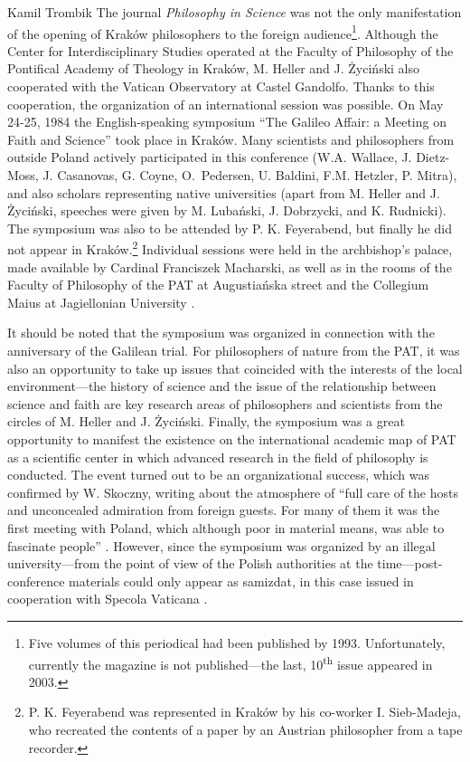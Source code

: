 \begin{artengenv}{Kamil Trombik}
The journal \textit{Philosophy in Science} was not the only manifestation of the opening of Kraków philosophers to the
foreign audience\footnote{Five volumes of this periodical had been published by 1993. Unfortunately, currently the
magazine is not published---the last, 10\textsuperscript{th} issue appeared in 2003.}. Although the Center for
Interdisciplinary Studies operated at the Faculty of Philosophy of the Pontifical Academy of Theology in Kraków, M.
Heller and J. Życiński also cooperated with the Vatican Observatory at Castel Gandolfo. Thanks to this cooperation, the
organization of an international session was possible. On May 24-25, 1984 the English-speaking symposium ``The Galileo
Affair: a Meeting on Faith and Science'' took place in Kraków. Many scientists and philosophers from outside Poland
actively participated in this conference (W.A. Wallace, J. Dietz-Moss, J. Casanovas, G. Coyne, O.~Pedersen, U. Baldini,
F.M. Hetzler, P. Mitra), and also scholars representing native universities (apart from M. Heller and J. Życiński,
speeches were given by M. Lubański, J. Dobrzycki, and K. Rudnicki). The symposium was also to be attended by P. K.
Feyerabend, but finally he did not appear in Kraków.\footnote{P. K. Feyerabend was represented in Kraków by his
co-worker I. Sieb-Madeja, who recreated the contents of a paper by an Austrian philosopher from a tape recorder.}
Individual sessions were held in the archbishop's palace, made available by Cardinal Franciszek Macharski, as well as
in the rooms of the Faculty of Philosophy of the PAT at Augustiańska street and the Collegium Maius at Jagiellonian
University
\parencite{skoczny_sympozjum_1984}.

It should be noted that the symposium was organized in connection with the anniversary of the Galilean trial. For
philosophers of nature from the PAT, it was also an opportunity to take up issues that coincided with the interests of
the local environment---the history of science and the issue of the relationship between science and faith are key
research areas of philosophers and scientists from the circles of M. Heller and J. Życiński. Finally, the symposium was
a great opportunity to manifest the existence on the international academic map of PAT as a scientific center in which
advanced research in the field of philosophy is conducted. The event turned out to be an organizational success, which
was confirmed by W. Skoczny, writing about the atmosphere of ``full care of the hosts and unconcealed admiration from
foreign guests. For many of them it was the first meeting with Poland, which although poor in material means, was able
to fascinate people''
\parencite[p.73]{skoczny_sympozjum_1984}.
However, since the symposium was organized by an
illegal university---from the point of view of the Polish authorities at the time---post-conference materials could
only appear as samizdat, in this case issued in cooperation with Specola Vaticana
\parencite{coyne_galileo_1985}.


\end{artengenv}
